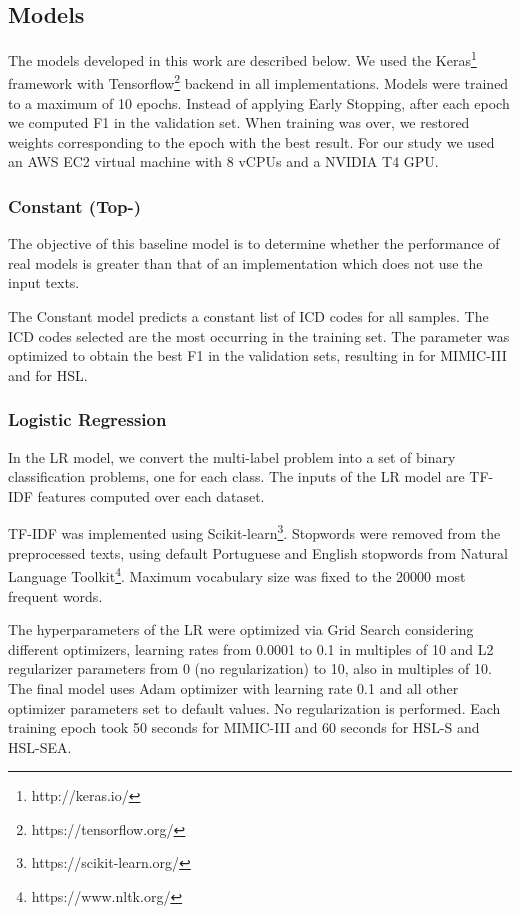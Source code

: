 \documentclass[runningheads]{llncs}
\begin{document}
\subsection{Models}

The models developed in this work are described below. We used the Keras\footnote{http://keras.io/} framework with Tensorflow\footnote{https://tensorflow.org/} backend in all implementations. Models were trained to a maximum of 10 epochs. Instead of applying Early Stopping, after each epoch we computed F1 in the validation set. When training was over, we restored weights corresponding to the epoch with the best result. For our study we used an AWS EC2 virtual machine with 8 vCPUs and a NVIDIA T4 GPU.

\subsubsection{Constant (Top-)}

The objective of this baseline model is to determine whether the performance of real models is greater than that of an implementation which does not use the input texts. 

The Constant model predicts a constant list of  ICD codes for all samples. The ICD codes selected are the  most occurring in the training set. The parameter  was optimized to obtain the best F1 in the validation sets, resulting in  for MIMIC-III and  for HSL.

\subsubsection{Logistic Regression}

In the LR model, we convert the multi-label problem into a set of binary classification problems, one for each class. The inputs of the LR model are TF-IDF features computed over each dataset.

TF-IDF was implemented using Scikit-learn\footnote{https://scikit-learn.org/}. Stopwords were removed from the preprocessed texts, using default Portuguese and English stopwords from Natural Language Toolkit\footnote{https://www.nltk.org/}. Maximum vocabulary size was fixed to the 20000 most frequent words.

The hyperparameters of the LR were optimized via Grid Search considering different optimizers, learning rates from 0.0001 to 0.1 in multiples of 10 and L2 regularizer parameters from 0 (no regularization) to 10, also in multiples of 10. The final model uses Adam optimizer with learning rate 0.1 and all other optimizer parameters set to default values. No regularization is performed. Each training epoch took 50 seconds for MIMIC-III and 60 seconds for HSL-S and HSL-SEA.
\end{document}
